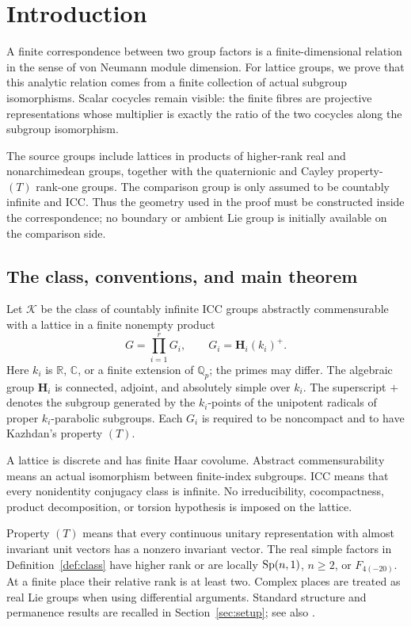 \section{Introduction}\label{sec:intro}
A finite correspondence between two group factors is a finite-dimensional
relation in the sense of von Neumann module dimension. For lattice groups,
we prove that this analytic relation comes from a finite collection of
actual subgroup isomorphisms. Scalar cocycles remain visible: the finite
fibres are projective representations whose multiplier is exactly the
ratio of the two cocycles along the subgroup isomorphism.

The source groups include lattices in products of higher-rank real and
nonarchimedean groups, together with the quaternionic and Cayley
property-$(T)$ rank-one groups. The comparison group is only assumed to
be countably infinite and ICC. Thus the geometry used in the proof must
be constructed inside the correspondence; no boundary or ambient Lie
group is initially available on the comparison side.

\subsection{The class, conventions, and main theorem}
\begin{definition}\label{def:class}
Let $\mathscr K$ be the class of countably infinite ICC groups abstractly
commensurable with a lattice in a finite nonempty product
\[
 G=\prod_{i=1}^r G_i,\qquad G_i=\mathbf H_i(k_i)^+.
\]
Here $k_i$ is $\mathbb R$, $\mathbb C$, or a finite extension of
$\mathbb Q_p$; the primes may differ. The algebraic group $\mathbf H_i$ is
connected, adjoint, and absolutely simple over $k_i$. The superscript $+$
denotes the subgroup generated by the $k_i$-points of the unipotent radicals
of proper $k_i$-parabolic subgroups. Each $G_i$ is required to be noncompact
and to have Kazhdan's property $(T)$.

A lattice is discrete and has finite Haar covolume. Abstract
commensurability means an actual isomorphism between finite-index
subgroups. ICC means that every nonidentity conjugacy class is infinite.
No irreducibility, cocompactness, product decomposition, or torsion
hypothesis is imposed on the lattice.
\end{definition}

Property $(T)$ means that every continuous unitary representation with
almost invariant unit vectors has a nonzero invariant vector. The real
simple factors in Definition~\ref{def:class} have higher rank or are locally
$\operatorname{Sp}(n,1)$, $n\geq2$, or $F_{4(-20)}$. At a finite place their relative
rank is at least two. Complex places are treated as real Lie groups when
using differential arguments. Standard structure and permanence results
are recalled in Section~\ref{sec:setup}; see also \cite{BHV2008}.

